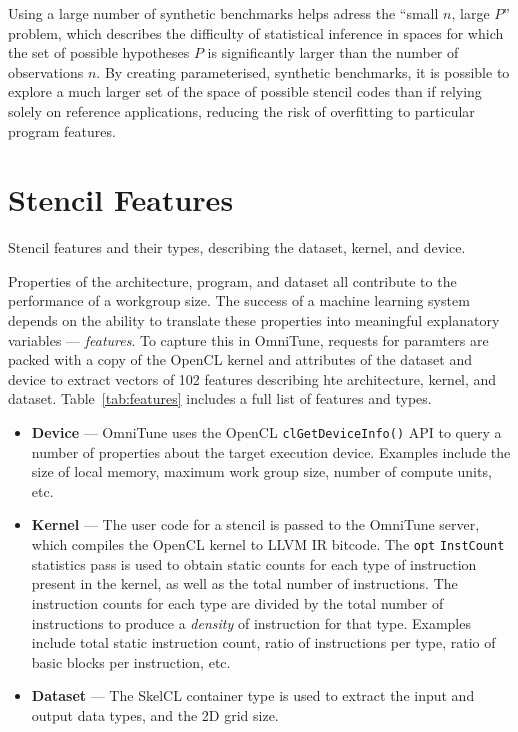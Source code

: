 Using a large number of synthetic benchmarks helps adress the ``small
$n$, large $P$'' problem, which describes the difficulty of
statistical inference in spaces for which the set of possible
hypotheses $P$ is significantly larger than the number of observations
$n$\CitationNeeded{}. By creating parameterised, synthetic benchmarks,
it is possible to explore a much larger set of the space of possible
stencil codes than if relying solely on reference applications,
reducing the risk of overfitting to particular program features.


\section{Stencil Features}


\begin{table}

\caption{Stencil features and their types, describing the dataset, kernel,
  and device.}
\label{tab:features}
\end{table}


Properties of the architecture, program, and dataset all contribute to
the performance of a workgroup size. The success of a machine learning
system depends on the ability to translate these properties into
meaningful explanatory variables --- \emph{features}. To capture this
in OmniTune, requests for paramters are packed with a copy of the
OpenCL kernel and attributes of the dataset and device to extract
vectors of 102 features describing hte architecture, kernel, and
dataset. Table~\ref{tab:features} includes a full list of features and
types.


\begin{itemize}
\item \textbf{Device} --- OmniTune uses the OpenCL
  \texttt{clGetDeviceInfo()} API to query a number of properties about
  the target execution device. Examples include the size of local
  memory, maximum work group size, number of compute units, etc.
\item \textbf{Kernel} --- The user code for a stencil is passed to the
  OmniTune server, which compiles the OpenCL kernel to LLVM IR
  bitcode. The \texttt{opt} \texttt{InstCount} statistics pass is used
  to obtain static counts for each type of instruction present in the
  kernel, as well as the total number of instructions. The instruction
  counts for each type are divided by the total number of instructions
  to produce a \emph{density} of instruction for that type. Examples
  include total static instruction count, ratio of instructions per
  type, ratio of basic blocks per instruction, etc.
\item \textbf{Dataset} --- The SkelCL container type is used to
  extract the input and output data types, and the 2D grid size.
\end{itemize}


